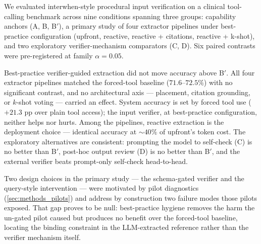 
We evaluated interwhen-style procedural input verification on a
clinical tool-calling benchmark across nine conditions spanning three
groups: capability anchors (A, B, B$'$), a primary study of four
extractor pipelines under best-practice configuration (upfront,
reactive, reactive + citations, reactive + k-shot), and two
exploratory verifier-mechanism comparators (C, D). Six paired
contrasts were pre-registered at family $\alpha=0.05$.

Best-practice verifier-guided extraction did not move accuracy above
B$'$. All four extractor pipelines matched the forced-tool baseline
($71.6$--$72.5\%$) with no significant contrast, and no architectural
axis --- placement, citation grounding, or $k$-shot voting --- carried
an effect. System accuracy is set by forced tool use ($+21.3$ pp over
plain tool access); the input verifier, at best-practice configuration,
neither helps nor hurts. Among the pipelines, reactive extraction is
the deployment choice --- identical accuracy at $\sim$$40\%$ of
upfront's token cost. The exploratory alternatives are consistent:
prompting the model to self-check (C) is no better than B$'$, post-hoc
output review (D) is no better than B$'$, and the external verifier
beats prompt-only self-check head-to-head.

Two design choices in the primary study --- the schema-gated verifier
and the query-style intervention --- were motivated by pilot
diagnostics (\cref{sec:methods_pilots}) and address by construction two
failure modes those pilots exposed. That gap proves to be null:
best-practice hygiene removes the harm the un-gated pilot caused but
produces no benefit over the forced-tool baseline, locating the binding
constraint in the LLM-extracted reference rather than the verifier
mechanism itself.
